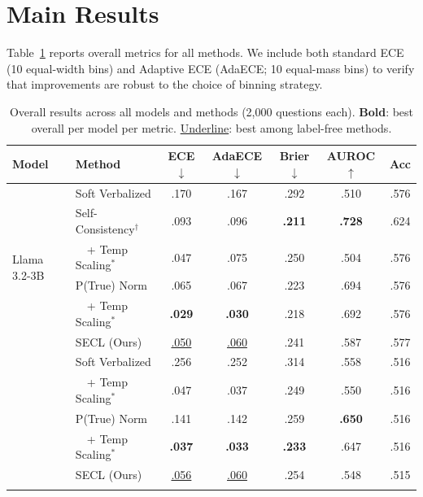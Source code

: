 \section{Main Results} \label{app:main_results}

Table~\ref{tab:main_results} reports overall metrics for all methods.
We include both standard ECE (10 equal-width bins) and Adaptive ECE
(AdaECE; 10 equal-mass bins) to verify that improvements are robust
to the choice of binning strategy.

\begin{table}[h]
\centering
\caption{Overall results across all models and methods (2{,}000 questions each).
\textbf{Bold}: best overall per model per metric.
\underline{Underline}: best among label-free methods.}
\label{tab:main_results}
\small
\begin{tabular}{@{}llccccc@{}}
\toprule
\textbf{Model} & \textbf{Method}
  & \textbf{ECE}$\downarrow$ & \textbf{AdaECE}$\downarrow$ & \textbf{Brier}$\downarrow$
  & \textbf{AUROC}$\uparrow$ & \textbf{Acc} \\
\midrule
\multirow{6}{*}{Llama 3.2-3B}
  & Soft Verbalized     & .170 & .167 & .292 & .510 & .576 \\
  & Self-Consistency$^\dagger$  & .093 & .096 & \textbf{.211} & \textbf{.728} & .624 \\
  & ~~+ Temp Scaling$^*$ & .047 & .075 & .250 & .504 & .576 \\
  & P(True) Norm        & .065 & .067 & .223 & .694 & .576 \\
  & ~~+ Temp Scaling$^*$ & \textbf{.029} & \textbf{.030} & .218 & .692 & .576 \\
  & SECL (Ours)         & \underline{.050} & \underline{.060} & .241 & .587 & .577 \\
\addlinespace
\multirow{5}{*}{Gemma 2-2B}
  & Soft Verbalized     & .256 & .252 & .314 & .558 & .516 \\
  & ~~+ Temp Scaling$^*$ & .047 & .037 & .249 & .550 & .516 \\
  & P(True) Norm        & .141 & .142 & .259 & \textbf{.650} & .516 \\
  & ~~+ Temp Scaling$^*$ & \textbf{.037} & \textbf{.033} & \textbf{.233} & .647 & .516 \\
  & SECL (Ours)         & \underline{.056} & \underline{.060} & .254 & .548 & .515 \\
\addlinespace

\end{tabular}
\end{table}
